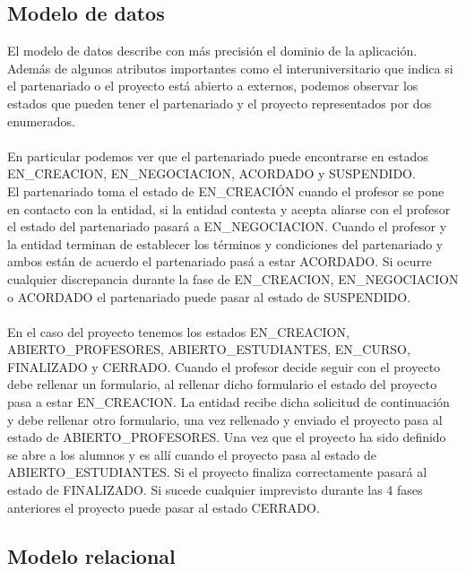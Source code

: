 \documentclass[11pt]{article}
\begin{document}
\subsection{Modelo de datos}
El modelo de datos describe con más precisión el dominio de la aplicación.
Además de algunos atributos importantes como el interuniversitario que indica si el partenariado o el proyecto está abierto a externos, podemos observar los estados que pueden tener el partenariado y el proyecto representados por dos enumerados.\\\\

En particular podemos ver que el partenariado puede encontrarse en estados EN\_CREACION, EN\_NEGOCIACION, ACORDADO y SUSPENDIDO.\\ 
El partenariado toma el estado de EN\_CREACIÓN cuando el profesor se pone en contacto con la entidad, si la entidad contesta y acepta aliarse con el profesor el estado del partenariado pasará a EN\_NEGOCIACION. Cuando el profesor y la entidad terminan de establecer los términos y condiciones del partenariado y ambos están de acuerdo el partenariado pasá a estar ACORDADO. Si ocurre cualquier discrepancia durante la fase de EN\_CREACION, EN\_NEGOCIACION o ACORDADO el partenariado puede pasar al estado de SUSPENDIDO.\\\\

En el caso del proyecto tenemos los estados EN\_CREACION, ABIERTO\_PROFESORES, ABIERTO\_ESTUDIANTES, EN\_CURSO, FINALIZADO y CERRADO.
Cuando el profesor decide seguir con el proyecto debe rellenar un formulario, al rellenar dicho formulario el estado del proyecto pasa a estar EN\_CREACION. La entidad recibe dicha solicitud de continuación y debe rellenar otro formulario, una vez rellenado y enviado el proyecto pasa al estado de ABIERTO\_PROFESORES. Una vez que el proyecto ha sido definido se abre a los alumnos y es allí cuando el proyecto pasa al estado de ABIERTO\_ESTUDIANTES. Si el proyecto finaliza correctamente pasará al estado de FINALIZADO. Si sucede cualquier imprevisto durante las 4 fases anteriores el proyecto puede pasar al estado CERRADO.

\subsection{Modelo relacional}
\end{document}
